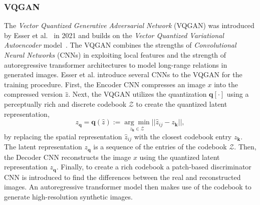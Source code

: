 \subsubsection{VQGAN}
\label{sec:wuerstchen:VQGAN}
The \emph{Vector Quantized Generative Adversarial Network} (VQGAN) was
introduced by Esser et al.~\cite{esser2021tamingtransformershighresolutionimage}
in 2021 and builds on the \emph{Vector Quantized Variational Autoencoder}
model~\cite{vdOord2017NeuralDiscreteRepresentationLearning}. The VQGAN combines
the strengths of \emph{Convolutional Neural Networks} (CNNs) in exploiting local 
features and the strength of autoregressive transformer architectures
to model long-range relations in generated images. Esser et al. introduce
several CNNs to the VQGAN for the training procedure. First, the Encoder CNN
compresses an image $x$ into the compressed version $\hat{z}$. Next,
the VQGAN utilizes the quantization $\boldsymbol{q}[\cdot]$ using a
perceptually rich and discrete codebook $\mathcal{Z}$ to create the quantized
latent representation,
\begin{equation}
    z_{\boldsymbol{q}} = \boldsymbol{q}(\hat{z}) :=\underset{z_{\boldsymbol{k}}\in\mathcal{Z}}{\arg\min}||\hat{z}_{ij} - z_{\boldsymbol{k}}||,
\end{equation}
by replacing the spatial representation $\hat{z}_{ij}$ with the closest
codebook entry $z_{\boldsymbol{k}}$. The latent representation
$z_{\boldsymbol{q}}$ is a sequence of the entries of the codebook $\mathcal{Z}$.
Then, the Decoder CNN reconstructs the image $x$ using the quantized latent
representation $z_{\boldsymbol{q}}$. Finally, to create a rich codebook
a patch-based discriminator CNN is introduced to find the differences between
the real and reconstructed images. An autoregressive transformer model then
makes use of the codebook to generate high-resolution synthetic images.
